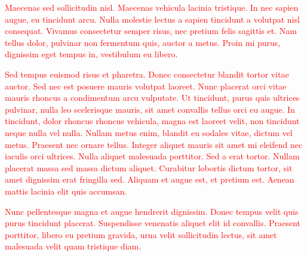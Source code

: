 \documentclass[11pt,letterpaper]{article}
\newcommand{\note}[1]{\textcolor{red}{#1}}
\begin{document}
\note{Maecenas sed sollicitudin nisl. Maecenas vehicula lacinia tristique. In nec sapien augue, eu tincidunt arcu. Nulla molestie lectus a sapien tincidunt a volutpat nisl consequat. Vivamus consectetur semper risus, nec pretium felis sagittis et. Nam tellus dolor, pulvinar non fermentum quis, auctor a metus. Proin mi purus, dignissim eget tempus in, vestibulum eu libero.}

\note{Sed tempus euismod risus et pharetra. Donec consectetur blandit tortor vitae auctor. Sed nec est posuere mauris volutpat laoreet. Nunc placerat orci vitae mauris rhoncus a condimentum arcu vulputate. Ut tincidunt, purus quis ultrices pulvinar, nulla leo scelerisque mauris, sit amet convallis tellus orci eu augue. In tincidunt, dolor rhoncus rhoncus vehicula, magna est laoreet velit, non tincidunt neque nulla vel nulla. Nullam metus enim, blandit eu sodales vitae, dictum vel metus. Praesent nec ornare tellus. Integer aliquet mauris sit amet mi eleifend nec iaculis orci ultrices. Nulla aliquet malesuada porttitor. Sed a erat tortor. Nullam placerat massa sed massa dictum aliquet. Curabitur lobortis dictum tortor, sit amet dignissim erat fringilla sed. Aliquam et augue est, et pretium est. Aenean mattis lacinia elit quis accumsan.}

\note{Nunc pellentesque magna et augue hendrerit dignissim. Donec tempus velit quis purus tincidunt placerat. Suspendisse venenatis aliquet elit id convallis. Praesent porttitor, libero eu pretium gravida, urna velit sollicitudin lectus, sit amet malesuada velit quam tristique diam.}

\end{document}
